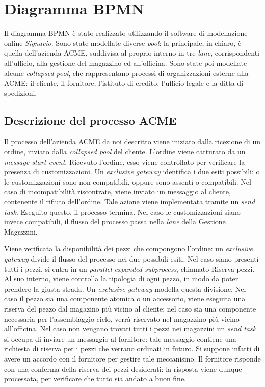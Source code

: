 \section{Diagramma BPMN}
Il diagramma BPMN \`e stato realizzato utilizzando il software di
modellazione online \textit{Signavio}.
Sono state modellate diverse \textit{pool}: la principale, in chiaro,
\`e quella dell'azienda ACME, suddivisa al proprio interno in tre
\textit{lane}, corrispondenti all'ufficio, alla gestione del magazzino
ed all'officina.
Sono state poi modellate alcune \textit{collapsed pool}, che
rappresentano processi di organizzazioni esterne alla ACME: il cliente,
il fornitore, l'istituto di credito, l'ufficio legale e la ditta di
spedizioni.

\subsection{Descrizione del processo ACME}
Il processo dell'azienda ACME da noi descritto viene iniziato dalla
ricezione di un ordine, inviato dalla \textit{collapsed pool} del
cliente.
L'ordine viene catturato da un \textit{message start event}.
Ricevuto l'ordine, esso viene controllato per verificare la presenza di
customizzazioni. Un \textit{exclusive gateway} identifica i due esiti
possibili: o le customizzazioni sono non compatibili, oppure sono
assenti o compatibili.
Nel caso di incompatibilit\`a riscontrate, viene inviato un messaggio al
cliente, contenente il rifiuto dell'ordine. Tale azione viene
implementata tramite un \textit{send task}. Eseguito questo, il processo
termina.
Nel caso le customizzazioni siano invece compatibili, il flusso del
processo passa nella \textit{lane} della Gestione Magazzini.

Viene verificata la disponibilit\`a dei pezzi che compongono l'ordine:
un \textit{exclusive gateway} divide il flusso del processo nei due
possibili esiti.
Nel caso siano presenti tutti i pezzi, si entra in un
\textit{parallel expanded subprocess}, chiamato Riserva pezzi. Al suo
interno, viene controlla la tipologia di ogni pezzo, in modo da poter
prendere la giusta strada. Un \textit{exclusive gateway} modella questa
divisione. Nel caso il pezzo sia una componente atomica o un accessorio,
viene eseguita una riserva del pezzo dal magazino pi\`u vicino al
cliente; nel caso sia una componente necessaria per l'assemblaggio
ciclo, verr\`a riservato nel magazzino pi\`u vicino all'officina.
Nel caso non vengano trovati tutti i pezzi nei magazzini un
\textit{send task} si occupa di inviare un messaggio al fornitore: tale
messaggio contiene una richiesta di riserva per i pezzi che verrano
ordinati in futuro. Si suppone infatti di avere un accordo con il
fornitore per gestire tale meccanismo.
Il fornitore risponde con una conferma della riserva dei pezzi
desiderati: la risposta viene dunque processata, per verificare che
tutto sia andato a buon fine.

